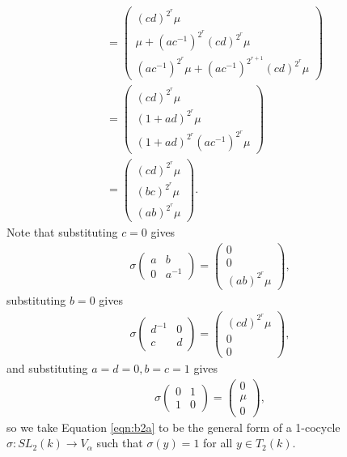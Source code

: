 \begin{align}
 \nonumber \\
		&=
			\left(\begin{matrix} (cd)^{2^r}\mu \\ \mu + (ac^{-1})^{2^r}(cd)^{2^r}\mu\\(ac^{-1})^{2^r}\mu + (ac^{-1})^{2^{r+1}}(cd)^{2^r}\mu \end{matrix}\right)
 \nonumber \\
		&=
			\left(\begin{matrix} (cd)^{2^r}\mu \\ (1 + ad)^{2^r}\mu \\ (1+ad)^{2^r}(ac^{-1})^{2^r}\mu \end{matrix}\right)
 \nonumber \\
		&=
			\left(\begin{matrix} (cd)^{2^r}\mu \\ (bc)^{2^r}\mu \\ (ab)^{2^r}\mu \end{matrix}\right)\label{eqn:b2a}.
	\end{align}
Note that substituting $c=0$ gives
\begin{align*}
\sigma\left(\begin{matrix}a & b \\ 0 & a^{-1}\end{matrix}\right) = \left(\begin{matrix} 0 \\ 0 \\ (ab)^{2^r}\mu\end{matrix}\right),
\end{align*}
substituting $b=0$ gives
\begin{align*}
\sigma\left(\begin{matrix}d^{-1} & 0 \\ c & d\end{matrix}\right) = \left(\begin{matrix} (cd)^{2^r}\mu \\ 0 \\ 0\end{matrix}\right),
\end{align*}
and substituting $a = d = 0, b = c = 1$ gives
\begin{align*}
\sigma\left(\begin{matrix}0 & 1 \\ 1 & 0\end{matrix}\right) = \left(\begin{matrix} 0 \\ \mu \\ 0\end{matrix}\right),
\end{align*}
so we take Equation \ref{eqn:b2a} to be the general form of a 1-cocycle $\sigma:SL_2(k)\rightarrow V_\alpha$ such that $\sigma(y) = 1$ for all $y\in T_2(k)$.

